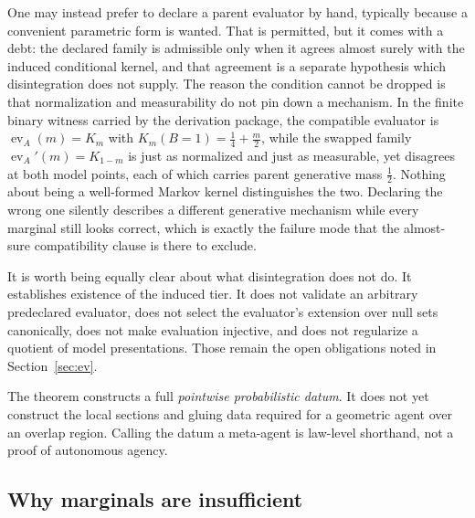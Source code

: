 \documentclass[11pt,letterpaper]{article}
\newcommand{\ev}{\operatorname{ev}}
\begin{document}
One may instead prefer to declare a parent evaluator by hand, typically because a convenient parametric form is wanted. That is permitted, but it comes with a debt: the declared family is admissible only when it agrees almost surely with the induced conditional kernel, and that agreement is a separate hypothesis which disintegration does not supply. The reason the condition cannot be dropped is that normalization and measurability do not pin down a mechanism. In the finite binary witness carried by the derivation package, the compatible evaluator is \(\ev_A(m)=K_m\) with \(K_m(B=1)=\tfrac14+\tfrac m2\), while the swapped family \(\ev_A'(m)=K_{1-m}\) is just as normalized and just as measurable, yet disagrees at both model points, each of which carries parent generative mass \(\tfrac12\). Nothing about being a well-formed Markov kernel distinguishes the two. Declaring the wrong one silently describes a different generative mechanism while every marginal still looks correct, which is exactly the failure mode that the almost-sure compatibility clause is there to exclude.

It is worth being equally clear about what disintegration does not do. It establishes existence of the induced tier. It does not validate an arbitrary predeclared evaluator, does not select the evaluator's extension over null sets canonically, does not make evaluation injective, and does not regularize a quotient of model presentations. Those remain the open obligations noted in Section~\ref{sec:ev}.

\begin{boundarybox}
The theorem constructs a full \emph{pointwise probabilistic datum}. It does not yet construct the local sections and gluing data required for a geometric agent over an overlap region. Calling the datum a meta-agent is law-level shorthand, not a proof of autonomous agency.
\end{boundarybox}

\subsection{Why marginals are insufficient}
\label{sec:marginals}
\end{document}
